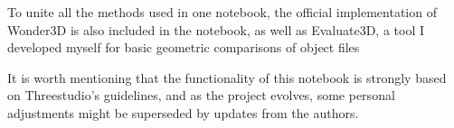 To unite all the methods used in one notebook, the official implementation of Wonder3D \citep{long2023wonder3d} is also included in the notebook, as well as Evaluate3D, a tool I developed myself for basic geometric comparisons of object files 

It is worth mentioning that the functionality of this notebook is strongly based on Threestudio's guidelines, and as the project evolves, some personal adjustments might be superseded by updates from the authors.


